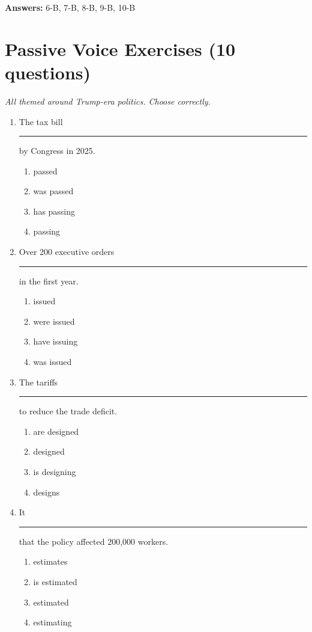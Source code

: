 \documentclass[10pt,a4paper]{article}
\begin{document}
\textbf{Answers:} 6-B, 7-B, 8-B, 9-B, 10-B

\section*{Passive Voice Exercises (10 questions)}

\textit{All themed around Trump-era politics. Choose correctly.}

\begin{enumerate}[label=\textbf{\arabic*.}, leftmargin=*]

\item The tax bill \rule{2cm}{0.4pt} by Congress in 2025.
\begin{enumerate}[label=(\Alph*)]
\item passed \item was passed \item has passing \item passing
\end{enumerate}

\item Over 200 executive orders \rule{2cm}{0.4pt} in the first year.
\begin{enumerate}[label=(\Alph*)]
\item issued \item were issued \item have issuing \item was issued
\end{enumerate}

\item The tariffs \rule{2cm}{0.4pt} to reduce the trade deficit.
\begin{enumerate}[label=(\Alph*)]
\item are designed \item designed \item is designing \item designs
\end{enumerate}

\item It \rule{2cm}{0.4pt} that the policy affected 200,000 workers.
\begin{enumerate}[label=(\Alph*)]
\item estimates \item is estimated \item estimated \item estimating
\end{enumerate}


\end{enumerate}
\end{document}
